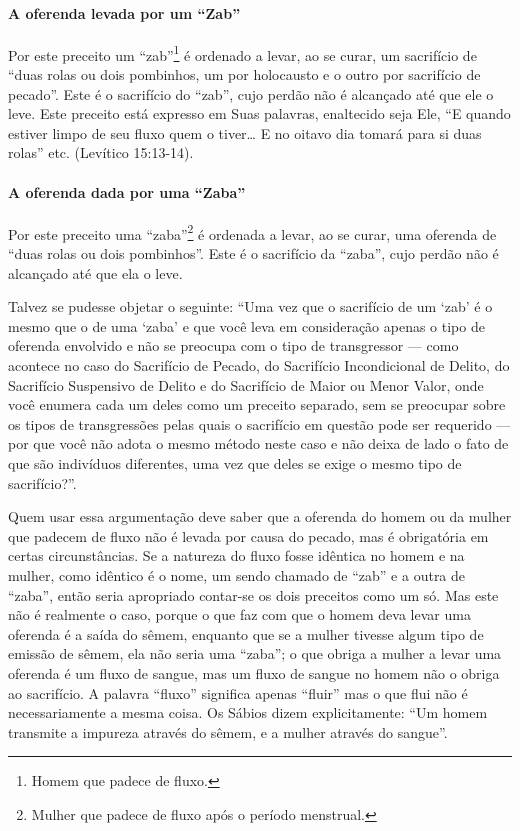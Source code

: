 \paragraph{A oferenda levada por um ``Zab''}

Por este preceito um ``zab''\footnote{Homem que padece de fluxo.} é ordenado a levar, ao
se curar, um sacrifício de ``duas rolas ou dois pombinhos, um por holocausto e o
outro por sacrifício de pecado''. Este é o sacrifício do ``zab'', cujo perdão não
é alcançado até que ele o leve. Este preceito está expresso em Suas
palavras, enaltecido seja Ele, ``E quando estiver limpo de seu fluxo
quem o tiver\ldots{} E no oitavo dia tomará para si duas rolas'' etc.
(Levítico 15:13-14).

\paragraph{A oferenda dada por uma ``Zaba''}

Por este preceito uma ``zaba''\footnote{Mulher que padece de fluxo após o período menstrual.} é ordenada a levar,
ao se curar, uma oferenda de ``duas rolas ou dois pombinhos''. Este é o
sacrifício da ``zaba'', cujo perdão não é alcançado até que ela o leve.

Talvez se pudesse objetar o seguinte: ``Uma vez que o sacrifício de um
`zab' é o mesmo que o de uma `zaba' e que você leva em consideração
apenas o tipo de oferenda envolvido e não se preocupa com o tipo de
transgressor --- como acontece no caso do Sacrifício de Pecado, do
Sacrifício Incondicional de Delito, do Sacrifício Suspensivo de Delito
e do Sacrifício de Maior ou Menor Valor, onde você enumera cada um deles
como um preceito separado, sem se preocupar sobre os tipos de
transgressões pelas quais o sacrifício em questão pode ser requerido ---
por que você não adota o mesmo método neste caso e não deixa de lado o
fato de que são indivíduos diferentes, uma vez que deles se exige o
mesmo tipo de sacrifício?''.

Quem usar essa argumentação deve saber que a oferenda do homem ou da
mulher que padecem de fluxo não é levada por causa do pecado, mas é
obrigatória em certas circunstâncias. Se a natureza do fluxo fosse
idêntica no homem e na mulher, como idêntico é o nome, um sendo chamado
de ``zab'' e a outra de ``zaba'', então seria apropriado contar-se os
dois preceitos como um só. Mas este não é realmente o caso, porque o que
faz com que o homem deva levar uma oferenda é a saída do sêmem, enquanto
que se a mulher tivesse algum tipo de emissão de sêmem, ela não seria
uma ``zaba''; o que obriga a mulher a levar uma oferenda é um fluxo de sangue, mas um fluxo de sangue
no homem não o obriga ao sacrifício. A palavra ``fluxo'' significa
apenas ``fluir'' mas o que flui não é necessariamente a mesma coisa. Os
Sábios dizem explicitamente: ``Um homem transmite a impureza através do
sêmem, e a mulher através do sangue''.

